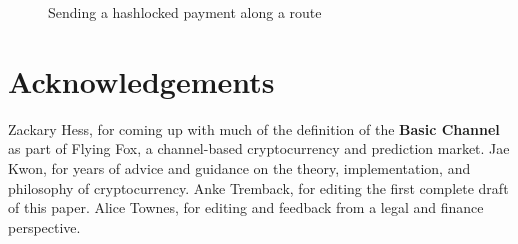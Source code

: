 \documentclass[a4paper]{article}
\begin{document}
\begin{figure}[H]
\centering
{}
\caption{Sending a hashlocked payment along a route}
\end{figure}

\pagebreak

\printglossaries

\section*{Acknowledgements}
Zackary Hess, for coming up with much of the definition of the \textbf{Basic Channel} as part of Flying Fox\cite{flyingfox}, a channel-based cryptocurrency and prediction market. Jae Kwon, for years of advice and guidance on the theory, implementation, and philosophy of cryptocurrency. Anke Tremback, for editing the first complete draft of this paper. Alice Townes, for editing and feedback from a legal and finance perspective.
\end{document}

